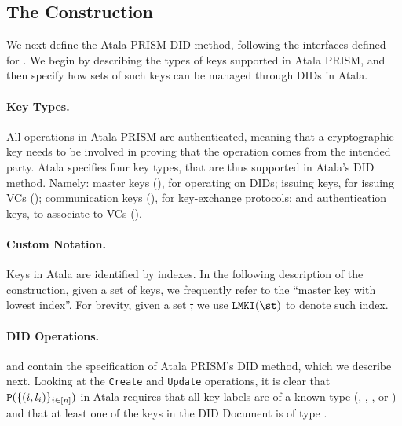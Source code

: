 \subsection{The \RealPKIDIDAtala Construction}

We next define the Atala PRISM DID method, following the interfaces defined for
\IdealFPKIDID. We begin by describing the types of keys supported in Atala
PRISM, and then specify how sets of such keys can be managed through DIDs in
Atala.

\paragraph{Key Types.} %
All operations in Atala PRISM are authenticated, meaning that a cryptographic
key needs to be involved in proving that the operation comes from the intended
party. Atala specifies four key types, that are thus supported in Atala's DID
method. Namely: master keys (\MasterKey), for operating on DIDs; issuing keys,
for issuing VCs (\IssueKey); communication keys (\CommKey), for key-exchange
protocols; and authentication keys, to associate to VCs (\AuthKey).

\paragraph{Custom Notation.} %
Keys in Atala are identified by indexes. In the following description of the
\RealPKIDIDAtala construction, given a set of keys, we frequently refer to the
``master key with lowest index''.  For brevity, given a set \st, we use
$\LMKI(\st)$ to denote such index.

\paragraph{DID Operations.} %
 and  contain the
specification of Atala PRISM's DID method,
which we describe next. Looking at the \texttt{Create} and \texttt{Update}
operations, it is clear that $\mathtt{P}(\lbrace (i, l_i) \rbrace_{i\in[n]})$ in
Atala requires that all key labels are of a known type (\MasterKey, \IssueKey,
\CommKey, or \AuthKey) and that at least one of the keys in the DID Document
is of type \MasterKey.

